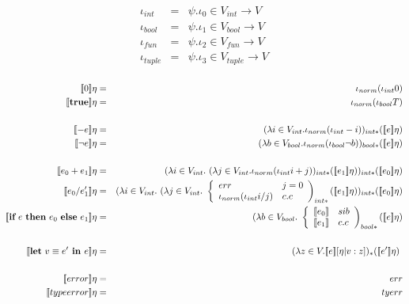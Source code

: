       \begin{eqnarray*}
        \iota_{int} &=& \psi . \iota_{0} \in V_{int} \rightarrow V \\
        \iota_{bool} &=& \psi . \iota_{1} \in V_{bool} \rightarrow V \\
        \iota_{fun} &=& \psi . \iota_{2} \in V_{fun} \rightarrow V \\
        \iota_{tuple} &=& \psi . \iota_{3} \in V_{tuple} \rightarrow V \\
      \end{eqnarray*}

      \begin{eqnarray*}
        \se{0}\eta &=& \iota_{norm}(\iota_{int} 0) \\
        \se{\textbf{true}}\eta &=& \iota_{norm}(\iota_{bool} T) \\ \\
        \se{-e}\eta &=& (\lambda i \in V_{int}. \iota_{norm}(\iota_{int} -i))_{int*}(\se{e}\eta) \\
        \se{\neg e}\eta &=& (\lambda b \in V_{bool}. \iota_{norm}(\iota_{bool} \neg b))_{bool*}(\se{e}\eta) \\ \\
        \se{e_0+e_1}\eta &=& (\lambda i \in V_{int}.\ (\lambda j \in V_{int}. \iota_{norm}(\iota_{int} i+j))_{int*}(\se{e_1}\eta))_{int*}(\se{e_0}\eta) \\
        \se{e_0/e_1'}\eta &=& (\lambda i \in V_{int}. \ (\lambda j \in V_{int}. \ \left\lbrace 
        \begin{array}{lll}
          err & j = 0 \\
          \iota_{norm}(\iota_{int} i/j) & c.c
        \end{array}\right)_{int*} (\se{e_1}\eta))_{int*} (\se{e_0}\eta) \\
        \se{\IF{e}{e_0}{e_1}}\eta &=& (\lambda b \in V_{bool}. \ \left\lbrace 
        \begin{array}{lll}
          \se{e_0} & si b \\
          \se{e_1} & c.c \\
        \end{array}\right)_{bool*} (\se{e}\eta) \\ \\
        \se{\textbf{let} \ v \equiv e' \textbf{ in } e}\eta &=& (\lambda z \in V. \se{e}[\eta | v : z])_{\ast}(\se{e'}\eta) \\ \\
        \se{error}\eta &=& err \\
        \se{typeerror}\eta &=& tyerr
      \end{eqnarray*}

